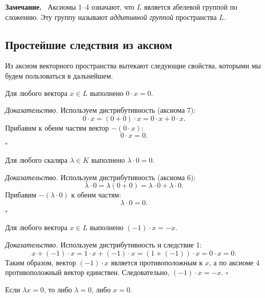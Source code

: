\documentclass[a4paper,12pt]{article}
\newcommand{\myremark}{\textbf{Замечание.}\ }
\theoremstyle{definition}
\theoremstyle{plain}
\theoremstyle{remark}
\begin{document}
	\myremark
	Аксиомы 1–4 означают, что \( L \) является абелевой группой по сложению. Эту группу называют \textit{аддитивной группой} пространства \( L \).
	
	\subsection{Простейшие следствия из аксиом}
	
	Из аксиом векторного пространства вытекают следующие свойства, которыми мы будем пользоваться в дальнейшем.
	
	\begin{tcolorbox}[colback=green!5, colframe=green!50!black, title=Следствие 1 (Умножение на нулевой скаляр)]
		Для любого вектора \( x \in L \) выполнено \( 0 \cdot x = 0 \).
	\end{tcolorbox}
	
	\medskip
	\textit{Доказательство.}
	Используем дистрибутивность (аксиома 7):
	\[
	0 \cdot x = (0 + 0) \cdot x = 0 \cdot x + 0 \cdot x.
	\]
	Прибавим к обеим частям вектор \( -(0 \cdot x) \):
	\[
	0 \cdot x = 0.
	\]
	\hfill \(\square\)
	
	\begin{tcolorbox}[colback=green!5, colframe=green!50!black, title=Следствие 2 (Умножение скаляра на нулевой вектор)]
		Для любого скаляра \( \lambda \in K \) выполнено \( \lambda \cdot 0 = 0 \).
	\end{tcolorbox}
	
	\medskip
	\textit{Доказательство.}
	Используем дистрибутивность (аксиома 6):
	\[
	\lambda \cdot 0 = \lambda (0 + 0) = \lambda \cdot 0 + \lambda \cdot 0.
	\]
	Прибавим \( -(\lambda \cdot 0) \) к обеим частям:
	\[
	\lambda \cdot 0 = 0.
	\]
	\hfill \(\square\)
	
	\begin{tcolorbox}[colback=green!5, colframe=green!50!black, title=Следствие 3 (Свойство противоположного вектора)]
		Для любого вектора \( x \in L \) выполнено \( (-1) \cdot x = -x \).
	\end{tcolorbox}
	
	\medskip
	\textit{Доказательство.}
	Используем дистрибутивность и следствие 1:
	\[
	x + (-1) \cdot x = 1 \cdot x + (-1) \cdot x = (1 + (-1)) \cdot x = 0 \cdot x = 0.
	\]
	Таким образом, вектор \( (-1) \cdot x \) является противоположным к \( x \), а по аксиоме 4 противоположный вектор единствен. Следовательно, \( (-1) \cdot x = -x \). \hfill \(\square\)
	
	\begin{tcolorbox}[colback=green!5, colframe=green!50!black, title=Следствие 4 (Умножение на скаляр равно нулю)]
		Если \( \lambda x = 0 \), то либо \( \lambda = 0 \), либо \( x = 0 \).
	\end{tcolorbox}
	
\end{document}
